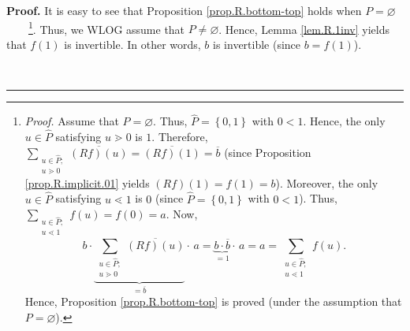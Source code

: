 \documentclass[numbers=enddot,12pt,final,onecolumn,notitlepage]{scrartcl}%
\theoremstyle{definition}
\newenvironment{verlong}{}{}
\newenvironment{proof}[1][Proof]{\noindent\textbf{#1.} }{\ \rule{0.5em}{0.5em}}
\let\sumnonlimits\sum
\renewcommand{\sum}{\sumnonlimits\limits}
\begin{document}
\begin{verlong}
\begin{proof}
It is easy to see that Proposition \ref{prop.R.bottom-top} holds when
$P=\varnothing$\ \ \ \ \footnote{\textit{Proof.} Assume that $P=\varnothing$.
Thus, $\widehat{P}=\left\{  0,1\right\}  $ with $0<1$. Hence, the only
$u\in\widehat{P}$ satisfying $u\gtrdot0$ is $1$. Therefore, $\sum
_{\substack{u\in\widehat{P};\\u\gtrdot0}}\overline{\left(  Rf\right)  \left(
u\right)  }=\overline{\left(  Rf\right)  \left(  1\right)  }=\overline{b}$
(since Proposition \ref{prop.R.implicit.01} yields $\left(  Rf\right)  \left(
1\right)  =f\left(  1\right)  =b$). Moreover, the only $u\in\widehat{P}$
satisfying $u\lessdot1$ is $0$ (since $\widehat{P}=\left\{  0,1\right\}  $
with $0<1$). Thus, $\sum_{\substack{u\in\widehat{P};\\u\lessdot1}}f\left(
u\right)  =f\left(  0\right)  =a$. Now,%
\[
b\cdot\underbrace{\sum_{\substack{u\in\widehat{P};\\u\gtrdot0}}\overline
{\left(  Rf\right)  \left(  u\right)  }}_{=\overline{b}}\cdot\,
a=\underbrace{b\cdot\overline{b}}_{=1}\cdot\, a=a=\sum_{\substack{u\in
\widehat{P};\\u\lessdot1}}f\left(  u\right)  .
\]
Hence, Proposition \ref{prop.R.bottom-top} is proved (under the assumption
that $P=\varnothing$).}. Thus, we WLOG assume that $P\neq\varnothing$. Hence,
Lemma \ref{lem.R.1inv} yields that $f\left(  1\right)  $ is invertible. In
other words, $b$ is invertible (since $b=f\left(  1\right)  $).


\end{proof}
\end{verlong}
\end{document}
